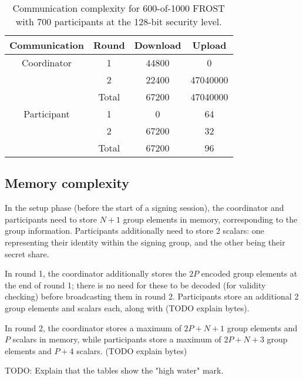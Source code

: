 \begin{table}
	\centering
	\begin{tabular}{c c c c}
		\toprule
		Communication & Round & Download & Upload \\ \midrule
		Coordinator & 1 & 44800 & 0 \\
		            & 2 & 22400 & 47040000 \\
		            & Total & 67200 & 47040000 \\
		\midrule
		Participant & 1 & 0 & 64 \\
		            & 2 & 67200 & 32 \\
		            & Total & 67200 & 96 \\
		\bottomrule
	\end{tabular}
	\caption{Communication complexity for 600-of-1000 FROST with 700 participants at the 128-bit security level.}
\end{table}

\subsection{Memory complexity}

In the setup phase (before the start of a signing session), the coordinator and
participants need to store $N + 1$ group elements in memory, corresponding to
the group information. Participants additionally need to store 2 scalars: one
representing their identity within the signing group, and the other being their
secret share.

In round 1, the coordinator additionally stores the $2P$ encoded group elements
at the end of round 1; there is no need for these to be decoded (for validity
checking) before broadcasting them in round 2. Participants store an additional
2 group elements and scalars each, along with (TODO explain bytes).

In round 2, the coordinator stores a maximum of $2P + N + 1$ group elements and
$P$ scalars in memory, while participants store a maximum of $2P + N + 3$ group
elements and $P + 4$ scalars. (TODO explain bytes)

TODO: Explain that the tables show the "high water" mark.

